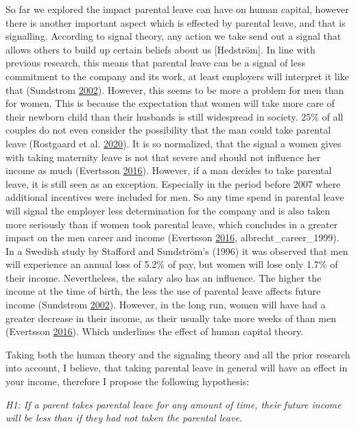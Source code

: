 \documentclass[
  12pt,
]{article}
\begin{document}
So far we explored the impact parental leave can have on human capital, however there is another important aspect which is effected by parental leave, and that is signalling. According to signal theory, any action we take send out a signal that allows others to build up certain beliefs about us {[}Hedström{]}. In line with previous research, this means that parental leave can be a signal of less commitment to the company and its work, at least employers will interpret it like that (Sundstrom \protect\hyperlink{ref-sundstrom_gender_2002}{2002}). However, this seems to be more a problem for men than for women. This is because the expectation that women will take more care of their newborn child than their husbands is still widespread in society. 25\% of all couples do not even consider the possibility that the man could take parental leave (Rostgaard et al. \protect\hyperlink{ref-rostgaard_parental_2020}{2020}). It is so normalized, that the signal a women gives with taking maternity leave is not that severe and should not influence her income as much (Evertsson \protect\hyperlink{ref-evertsson_parental_2016}{2016}). However, if a man decides to take parental leave, it is still seen as an exception. Especially in the period before 2007 where additional incentives were included for men. So any time spend in parental leave will signal the employer less determination for the company and is also taken more seriously than if women took parental leave, which concludes in a greater impact on the men career and income (Evertsson \protect\hyperlink{ref-evertsson_parental_2016}{2016}, albrecht\_career\_1999). In a Swedish study by Stafford and Sundström's (1996) it was observed that men will experience an annual loss of 5.2\% of pay, but women will lose only 1.7\% of their income. Nevertheless, the salary also has an influence. The higher the income at the time of birth, the less the use of parental leave affects future income (Sundstrom \protect\hyperlink{ref-sundstrom_gender_2002}{2002}). However, in the long run, women will have had a greater decrease in their income, as their usually take more weeks of than men (Evertsson \protect\hyperlink{ref-evertsson_parental_2016}{2016}). Which underlines the effect of human capital theory.

Taking both the human theory and the signaling theory and all the prior research into account, I believe, that taking parental leave in general will have an effect in your income, therefore I propose the following hypothesis:

\emph{H1: If a parent takes parental leave for any amount of time, their future income will be less than if they had not taken the parental leave.}
\end{document}
